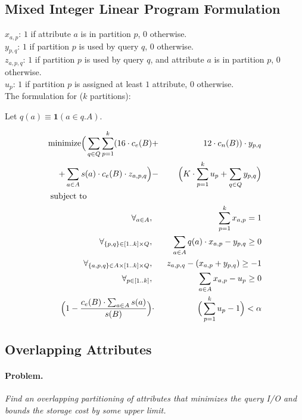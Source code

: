 \documentclass[twocolumn]{svjour3}          %
\begin{document}
\subsection{Mixed Integer Linear Program Formulation}
$x_{a,p}$: $1$ if attribute $a$ is in partition $p$, $0$ otherwise.\\
$y_{p,q}$: $1$ if partition $p$ is used by query $q$, $0$ otherwise.\\
$z_{a,p,q}$: $1$ if partition $p$ is used by query $q$, and attribute $a$ is in partition $p$, $0$ otherwise.\\
$u_{p}$: $1$ if partition $p$ is assigned at least $1$ attribute, $0$ otherwise.\\
The formulation for ($k$ partitions):

Let $q(a)\equiv \mathbf{1}(a \in q.A)$.

\begin{eqnarray}
\text{minimize} 
    \Big(\sum_{q\in Q} \sum_{p=1}^{k} (16\cdot c_e(B) &+& 12\cdot c_n(B))\cdot y_{p,q}\nonumber\\
    + \sum_{a\in A} s(a)\cdot c_e(B)\cdot z_{a,p,q}\Big) &-& \Big(K\cdot \sum_{p=1}^{k} u_p + \sum_{q\in Q} y_{p,q}\Big) \nonumber\\
\text{subject to}\hspace{2.75cm}&&\nonumber\\
\forall_{a\in A}, 
    && \sum_{p=1}^{k} x_{a,p} = 1\nonumber\\
\forall_{\{p,q\}\in [1..k]\times Q}, 
    &&  \sum_{a\in A} q(a)\cdot x_{a,p} - y_{p,q} \geq 0 \nonumber\\
\forall_{\{a,p,q\}\in A\times [1..k]\times Q},
  && z_{a,p,q} - (x_{a,p} + y_{p,q}) \geq -1\nonumber\\
\forall_{p\in[1..k]},
   && \sum_{a\in A} x_{a,p} - u_p \geq 0 \nonumber\\
\Big(1-\frac{c_e(B)\cdot \sum_{a\in A} s(a)}{s(B)}\Big) &\cdot& \Big(\sum_{p=1}^{k} u_p -1\Big) < \alpha \nonumber
\end{eqnarray}



\subsection{Overlapping Attributes}

\paragraph*{Problem.}\emph{Find an overlapping partitioning of attributes that minimizes
  the query I/O and bounds the storage cost by some upper limit.}
\end{document}
